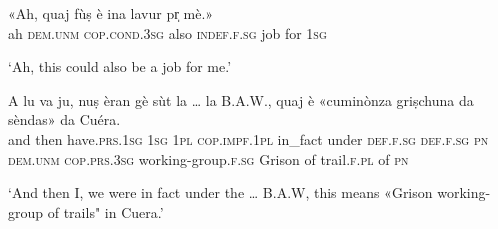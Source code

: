 \begin{linenumbers}
\gll «Ah, quaj fùṣ è ina lavur pr̩ mè.»   \\
ah \textsc{dem.unm} \textsc{cop.cond.3sg} also \textsc{indef.f.sg} job for \textsc{1sg} \\
\end{linenumbers}
\medskip
\glt `Ah, this could also be a job for me.'
\medskip

\begin{linenumbers}
\gll A lu va ju, nuṣ èran gè sùt la … la B.A.W.\footnotemark, quaj è «cuminònza griṣchuna da sèndas» da Cuéra.    \\
and then have.\textsc{prs.1sg} \textsc{1sg} \textsc{1pl} \textsc{cop.impf.1pl} in\_fact under \textsc{def.f.sg} {} \textsc{def.f.sg}  \textsc{pn}  \textsc{dem.unm} \textsc{cop.prs.3sg} working-group.\textsc{f.sg} Grison of  trail.\textsc{f.pl} of \textsc{pn} \\
\end{linenumbers}
\medskip
\glt `And then I, we were in fact under the … B.A.W, this means «Grison working-group of trails" in Cuera.'
\medskip

